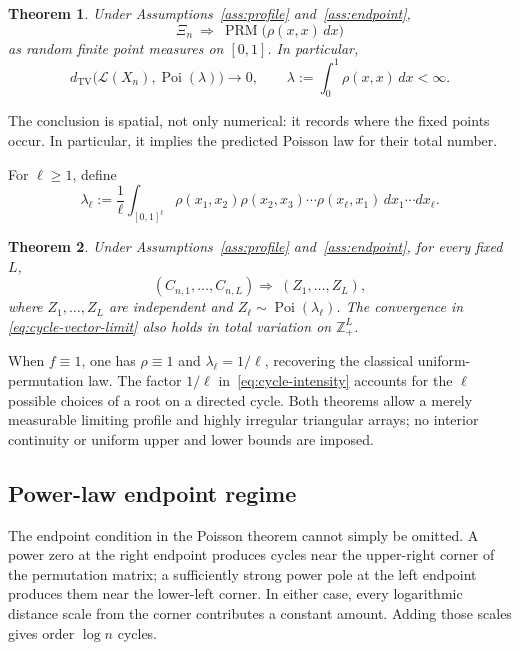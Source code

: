 \documentclass[11pt]{article}
\newtheorem{theorem}{Theorem}[section]
\theoremstyle{remark}
\theoremstyle{plain}
\newcommand{\cL}{\mathcal L}
\newcommand{\Poi}{\operatorname{Poi}}
\newcommand{\TV}{\operatorname{TV}}
\begin{document}
\begin{theorem}\label{thm:main-poisson}
Under Assumptions~\ref{ass:profile} and~\ref{ass:endpoint},
\begin{equation}\label{eq:point-process-limit}
 \Xi_n\ \Longrightarrow\ \operatorname{PRM}
 \bigl(\rho(x,x)\,dx\bigr)
\end{equation}
as random finite point measures on $[0,1]$.  In particular,
\begin{equation}\label{eq:count-poisson}
 d_{\TV}\bigl(\cL(X_n),\Poi(\lambda)\bigr)\longrightarrow0,
 \qquad
 \lambda:=\int_0^1\rho(x,x)\,dx<\infty.
\end{equation}
\end{theorem}

The conclusion is spatial, not only numerical: it records where the fixed
points occur.  In particular, it implies the predicted Poisson law for their
total number.

For $\ell\ge1$, define
\begin{equation}\label{eq:cycle-intensity}
 \lambda_\ell:=\frac1\ell\int_{[0,1]^\ell}
 \rho(x_1,x_2)\rho(x_2,x_3)\cdots\rho(x_\ell,x_1)
 \,dx_1\cdots dx_\ell.
\end{equation}

\begin{theorem}\label{thm:short-cycles}
Under Assumptions~\ref{ass:profile} and~\ref{ass:endpoint}, for every fixed
$L$,
\begin{equation}\label{eq:cycle-vector-limit}
 (C_{n,1},\ldots,C_{n,L}) \Longrightarrow\
 (Z_1,\ldots,Z_L),
\end{equation}
where $Z_1,\ldots,Z_L$ are independent and
$Z_\ell\sim\Poi(\lambda_\ell)$.  The convergence in
\eqref{eq:cycle-vector-limit} also holds in total variation on
$\mathbb Z_+^L$.
\end{theorem}

When $f\equiv1$, one has $\rho\equiv1$ and
$\lambda_\ell=1/\ell$, recovering the classical uniform-permutation law.
The factor $1/\ell$ in~\eqref{eq:cycle-intensity} accounts for the $\ell$
possible choices of a root on a directed cycle.  Both theorems allow a merely
measurable limiting profile and highly irregular triangular arrays; no
interior continuity or uniform upper and lower bounds are imposed.

\subsection{Power-law endpoint regime}

The endpoint condition in the Poisson theorem cannot simply be omitted.  A
power zero at the right endpoint produces cycles near the upper-right corner
of the permutation matrix; a sufficiently strong power pole at the left
endpoint produces them near the lower-left corner.  In either case, every
logarithmic distance scale from the corner contributes a constant amount.
Adding those scales gives order $\log n$ cycles.
\end{document}
